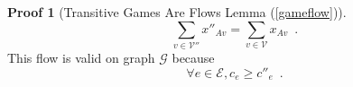 \documentclass[11pt]{llncs}
\theoremstyle{definition}
\newtheorem{sepproof}{Proof}
\begin{document}
\begin{sepproof}[Transitive Games Are Flows Lemma (\ref{gameflow})]
\begin{equation}
          \sum\limits_{v \in \mathcal{V}''}x''_{Av} = \sum\limits_{v \in \mathcal{V}}x_{Av} \enspace.
       \end{equation}
       This flow is valid on graph $\mathcal{G}$ because
       \begin{equation}
          \forall e \in \mathcal{E}, c_e \geq c''_e \enspace.
       \end{equation}

\end{sepproof}
\end{document}
